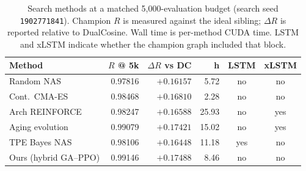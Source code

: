 \begin{table}[t]
  \centering
  \caption{Search methods at a matched 5,000-evaluation budget (search seed \texttt{1902771841}). Champion $R$ is measured against the ideal sibling; $\Delta R$ is reported relative to DualCosine. Wall time is per-method CUDA time. LSTM and xLSTM indicate whether the champion graph included that block.}
  \label{tab:meta-approaches}
  \setlength{\tabcolsep}{2pt}
  \scriptsize
  \begin{tabular}{@{}lrrrcc@{}}
    \toprule
    Method & $R$ @ 5k & $\Delta R$ vs DC & h & LSTM & xLSTM \\
    \midrule
    Random NAS & 0.97816 & $+0.16157$ & 5.72 & no & no \\
    Cont.\ CMA-ES & 0.98468 & $+0.16810$ & 2.28 & no & no \\
    Arch REINFORCE & 0.98247 & $+0.16588$ & 25.93 & no & yes \\
    Aging evolution & 0.99079 & $+0.17421$ & 15.02 & no & yes \\
    TPE Bayes NAS & 0.98106 & $+0.16448$ & 11.18 & yes & no \\
    Ours (hybrid GA--PPO) & 0.99146 & $+0.17488$ & 8.46 & no & no \\
    \bottomrule
  \end{tabular}
\end{table}
